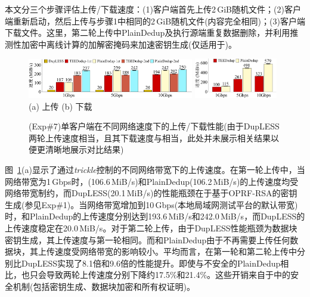 本文分三个步骤评估上传/下载速度：(1)客户端首先上传2\,GiB随机文件；(2)客户端重新启动，然后上传与步骤1中相同的2\,GiB随机文件(内容完全相同)；(3)客户端下载文件。这里，第二轮上传中PlainDedup及\sysnameS 执行源端重复数据删除，并利用推测性加密中离线计算的加解密掩码来加速密钥生成(仅适用于\sysnameS)。

\begin{figure}[!htb]
    \centering
    \includegraphics[width=0.646\textwidth]{pic/sgxdedup/plot/exp_b1/upload_network_speed_bar.pdf}
    \includegraphics[width=0.324\textwidth]{pic/sgxdedup/plot/exp_b1/download_network_speed_bar.pdf}
    \\
    \hspace{1.1in} {\small (a) 上传} \hspace{1.9in}
    {\small (b) 下载}\\
    \caption{(Exp\#7)单客户端在不同网络速度下的上传/下载性能(由于DupLESS两轮上传速度相当，且其下载速度与\sysnameS 相当，此处并未展示相关结果以便更清晰地展示对比结果)}
    \label{fig:sgxdedup-singleClientThroughput}
\end{figure}

图~\ref{fig:sgxdedup-singleClientThroughput}(a)显示了通过\textit{trickle}控制的不同网络带宽下的上传速度。在第一轮上传中，当网络带宽为1\,Gbps时，\sysnameS (106.6\,MiB/s)和PlainDedup(106.2\,MiB/s)的上传速度均受网络带宽制约，而DupLESS(20.1\,MiB/s)的性能瓶颈在于基于OPRF-RSA的密钥生成(参见Exp\#1)。当网络带宽增加到10\,Gbps(本地局域网测试平台的默认带宽)时，\sysnameS 和PlainDedup的上传速度分别达到193.6\,MiB/s和242.0\,MiB/s，而DupLESS的上传速度稳定在20.0\,MiB/s。对于第二轮上传，由于DupLESS性能瓶颈为数据块密钥生成，其上传速度与第一轮相同。而\sysnameS 和PlainDedup由于不再需要上传任何数据块，其上传速度受网络带宽的影响较小。平均而言，\sysnameS 在第一轮和第二轮上传中分别比DupLESS实现了8.1倍和9.6倍的性能提升。即使与不安全的PlainDedup相比，\sysnameS 也只会导致两轮上传速度分别下降约17.5\%和21.4\%。这些开销来自于\sysnameS 中的安全机制(包括密钥生成、数据块加密和所有权证明)。

